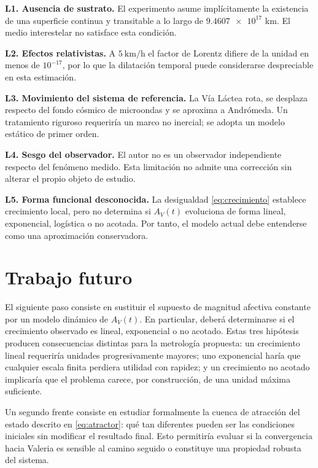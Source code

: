 \documentclass[conference]{IEEEtran}
\begin{document}
\textbf{L1. Ausencia de sustrato.} El experimento asume implícitamente la
existencia de una superficie continua y transitable a lo largo de
$\num{9.4607e17}$ km. El medio interestelar no satisface esta condición.

\textbf{L2. Efectos relativistas.} A $\qty{5}{\kilo\meter\per\hour}$ el factor
de Lorentz difiere de la unidad en menos de $10^{-17}$, por lo que la dilatación
temporal puede considerarse despreciable en esta estimación.

\textbf{L3. Movimiento del sistema de referencia.} La Vía Láctea rota, se
desplaza respecto del fondo cósmico de microondas y se aproxima a Andrómeda.
Un tratamiento riguroso requeriría un marco no inercial; se adopta un modelo
estático de primer orden.

\textbf{L4. Sesgo del observador.} El autor no es un observador independiente
respecto del fenómeno medido. Esta limitación no admite una corrección sin
alterar el propio objeto de estudio.

\textbf{L5. Forma funcional desconocida.} La desigualdad
\eqref{eq:crecimiento} establece crecimiento local, pero no determina si
$A_V(t)$ evoluciona de forma lineal, exponencial, logística o no acotada. Por
tanto, el modelo actual debe entenderse como una aproximación conservadora.

\section{Trabajo futuro}
\label{sec:futuro}

El siguiente paso consiste en sustituir el supuesto de magnitud afectiva
constante por un modelo dinámico de $A_V(t)$. En particular, deberá determinarse
si el crecimiento observado es lineal, exponencial o no acotado. Estas tres
hipótesis producen consecuencias distintas para la metrología propuesta: un
crecimiento lineal requeriría unidades progresivamente mayores; uno exponencial
haría que cualquier escala finita perdiera utilidad con rapidez; y un crecimiento
no acotado implicaría que el problema carece, por construcción, de una unidad
máxima suficiente.

Un segundo frente consiste en estudiar formalmente la cuenca de atracción del
estado descrito en \eqref{eq:atractor}: qué tan diferentes pueden ser las
condiciones iniciales sin modificar el resultado final. Esto permitiría evaluar
si la convergencia hacia Valeria es sensible al camino seguido o constituye una
propiedad robusta del sistema.
\end{document}
